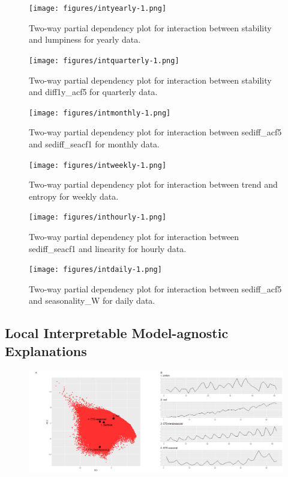 \documentclass[11pt,a4paper,]{article}
\begin{document}
\begin{figure}
\centering
\texttt{[image: figures/intyearly-1.png]}
\caption{\label{fig:intyearly}Two-way partial dependency plot for
interaction between stability and lumpiness for yearly data.}
\end{figure}

\begin{figure}
\centering
\texttt{[image: figures/intquarterly-1.png]}
\caption{\label{fig:intquarterly}Two-way partial dependency plot for
interaction between stability and diff1y\_acf5 for quarterly data.}
\end{figure}

\begin{figure}
\centering
\texttt{[image: figures/intmonthly-1.png]}
\caption{\label{fig:intmonthly}Two-way partial dependency plot for
interaction between sediff\_acf5 and sediff\_seacf1 for monthly data.}
\end{figure}

\begin{figure}
\centering
\texttt{[image: figures/intweekly-1.png]}
\caption{\label{fig:intweekly}Two-way partial dependency plot for
interaction between trend and entropy for weekly data.}
\end{figure}

\begin{figure}
\centering
\texttt{[image: figures/inthourly-1.png]}
\caption{\label{fig:inthourly}Two-way partial dependency plot for
interaction between sediff\_seacf1 and linearity for hourly data.}
\end{figure}

\begin{figure}
\centering
\texttt{[image: figures/intdaily-1.png]}
\caption{\label{fig:intdaily}Two-way partial dependency plot for interaction
between sediff\_acf5 and seasonality\_W for daily data.}
\end{figure}

\clearpage

\subsection{Local Interpretable Model-agnostic
Explanations}\label{local-interpretable-model-agnostic-explanations}

\begin{figure}[h]

{\centering \includegraphics{figures/quarterlylime-1} 

}

\end{figure}
\end{document}
